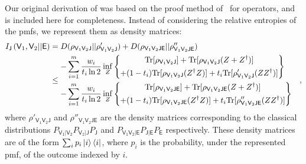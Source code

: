 \documentclass[10pt, a4paper]{article}
\numberwithin{equation}{section} %
\theoremstyle{definition}
\theoremstyle{plain}
\newcommand{\?}{\mathrel{?}} %
\newcommand{\Tr}{\mathrm{Tr}} %
\newcommand{\crv}[1]{\mathsf{#1}}
\begin{document}
\begin{appendices}
    Our original derivation of  was based on the proof method of~\cite{BFF_QRE} for operators, and is included here for completeness. Instead of considering the relative entropies of the pmfs, we represent them as density matrices:
    \begin{align}
      \splitkey{\crv{V}_1,\crv{V}_2}{\crv{E}} &=  D(\rho_{\crv{V}_1\crv{V}_2\crv{J}}||\rho'_{\crv{V}_1\crv{V}_2\crv{J}})
      + D(\rho_{\crv{V}_1\crv{V}_2\crv{JE}}||\rho''_{\crv{V}_1\crv{V}_2\crv{JE}}) \\
                                              &\leq \begin{aligned}
    - & \sum_{i=1}^m  \frac{w_i}{t_i\ln{2}}  \inf_{Z} \left\{ \begin{gathered}
    \Tr[\rho_{\crv{V}_1\crv{V}_2\crv{J}}]
    + \Tr[\rho_{\crv{V}_1\crv{V}_2\crv{J}} (Z + Z^{\dagger})] \\
    + (1-t_i) \Tr[\rho_{\crv{V}_1\crv{V}_2\crv{J}} (Z^{\dagger}Z)] 
    + t_i \Tr[\rho'_{\crv{V}_1\crv{V}_2\crv{J}} (ZZ^{\dagger})]
    \end{gathered} \right\} \\
    - & \sum_{i=1}^m \frac{w_i}{t_i\ln{2}} \inf_Z \left\{ \begin{gathered}
    \Tr[\rho_{\crv{V}_1\crv{V}_2\crv{JE}}]
    + \Tr[\rho_{\crv{V}_1\crv{V}_2\crv{JE}} (Z + Z^{\dagger})] \\
    + (1-t_i) \Tr[\rho_{\crv{V}_1\crv{V}_2\crv{JE}} (Z^{\dagger}Z)]
    + t_i \Tr[\rho''_{\crv{V}_1\crv{V}_2\crv{JE}} (ZZ^{\dagger})]
    \end{gathered} \right\}
    \end{aligned},
    \end{align}
    where \(\rho'_{\crv{V}_1\crv{V}_2\crv{J}}\) and \(\rho''_{\crv{V}_1\crv{V}_2\crv{JE}}\) are the density matrices corresponding to the classical distributions \(P_{\crv{V_1|V_2}} P_{\crv{V}_2|\crv{J}} P_{\crv{J}}\) and \(P_{\crv{V_1V_2|E}} P_{\crv{J|E}} P_{\crv{E}}\) respectively. These density matrices are of the form \(\sum_i p_i \ket{i}\bra{i}\), where \(p_i\) is the probability, under the represented pmf, of the outcome indexed by \(i\).


\end{appendices}
\end{document}
